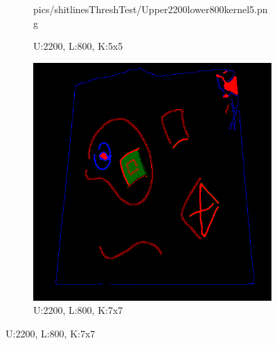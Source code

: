 \documentclass[11pt]{article}
\begin{document}
\begin{figure}[H]
\begin{subfigure}[t]{.25\textwidth}
		{pics/shitlinesThreshTest/Upper2200lower800kernel5.png}
		\caption{U:2200, L:800, K:5x5}
		\label{kernelExample1}
	\end{subfigure}
\hfill
	\begin{subfigure}[t]{.25\textwidth}
		\centering
		\includegraphics[scale=0.3]
		{pics/shitlinesThreshTest/Upper2200lower800kernel7.png}
		\caption{U:2200, L:800, K:7x7}
		\label{kernelExample2}
	\end{subfigure}



\end{figure}
\end{document}

